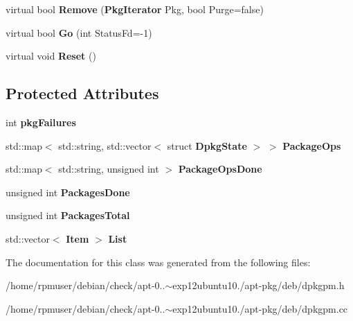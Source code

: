 \begin{DoxyCompactItemize}
\item 
virtual bool {\bfseries \-Remove} ({\bf \-Pkg\-Iterator} \-Pkg, bool \-Purge=false)\label{classpkgDPkgPM_a0fc997d1b3b078d21271df1c16813479}

\item 
virtual bool {\bfseries \-Go} (int \-Status\-Fd=-\/1)\label{classpkgDPkgPM_aab500dc5936894f0c526222ad491a0f6}

\item 
virtual void {\bfseries \-Reset} ()\label{classpkgDPkgPM_a372de693ad40b3f42839c8ec6ac845f4}

\end{DoxyCompactItemize}
\subsection*{\-Protected \-Attributes}
\begin{DoxyCompactItemize}
\item 
int {\bfseries pkg\-Failures}\label{classpkgDPkgPM_a70d3397a28f7837466efc1caa9cc27b7}

\item 
std\-::map$<$ std\-::string, \*
std\-::vector$<$ struct {\bf \-Dpkg\-State} $>$ $>$ {\bfseries \-Package\-Ops}\label{classpkgDPkgPM_ab75bd21bb6014527bebc76fb12a7a2bb}

\item 
std\-::map$<$ std\-::string, \*
unsigned int $>$ {\bfseries \-Package\-Ops\-Done}\label{classpkgDPkgPM_a2dd96d391e75d5246f339975c3ea8c4f}

\item 
unsigned int {\bfseries \-Packages\-Done}\label{classpkgDPkgPM_a14269522f51e4bfd222ea4aa06df49df}

\item 
unsigned int {\bfseries \-Packages\-Total}\label{classpkgDPkgPM_abfc859389195c81801fa7fcae30ddb5f}

\item 
std\-::vector$<$ {\bf \-Item} $>$ {\bfseries \-List}\label{classpkgDPkgPM_a0e2503fb8602a7183931947a2981a333}

\end{DoxyCompactItemize}


\-The documentation for this class was generated from the following files\-:\begin{DoxyCompactItemize}
\item 
/home/rpmuser/debian/check/apt-\/0..$\sim$exp12ubuntu10./apt-\/pkg/deb/dpkgpm.\-h\item 
/home/rpmuser/debian/check/apt-\/0..$\sim$exp12ubuntu10./apt-\/pkg/deb/dpkgpm.\-cc\end{DoxyCompactItemize}
